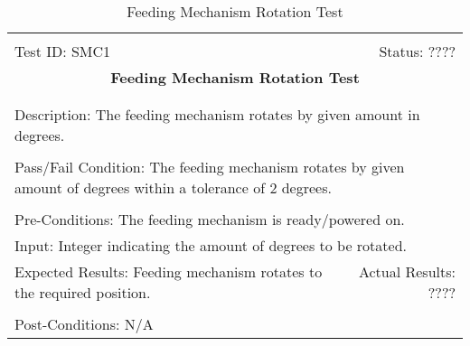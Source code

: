 \documentclass[11pt]{article}
\begin{document}
\begin{center}
\begin{table}[H]
\begin{tabular}{|l r|}\hline&\\[-2mm]
	Test ID: SMC1	&Status: ????\\[-3mm]
	\multicolumn{2}{|c|}{\textbf{\large{Feeding Mechanism Rotation Test}}}\\&\\\hline&\\[-3mm]
	\multicolumn{2}{|p{\textwidth}|}{Description: The feeding mechanism rotates by given amount in degrees.}\\[1mm]\hline&\\[-3mm]
	\multicolumn{2}{|p{\textwidth}|}{Pass/Fail Condition: The feeding mechanism rotates by given amount of degrees within a tolerance of 2 degrees.}\\[1mm]\hline&\\[-3mm]
	\multicolumn{2}{|p{\textwidth}|}{Pre-Conditions: The feeding mechanism is ready/powered on.}\\[4mm]
	\multicolumn{2}{|p{\textwidth}|}{Input: Integer indicating the amount of degrees to be rotated.}\\[2mm]\hline
	\multicolumn{1}{|p{0.49\textwidth}}{Expected Results: Feeding mechanism rotates to the required position.}	&\multicolumn{1}{|p{0.45\textwidth}|}{Actual Results: ????}\\\hline&\\[-3mm]
	\multicolumn{2}{|p{\textwidth}|}{Post-Conditions: N/A}\\\hline
\end{tabular}
\caption{Feeding Mechanism Rotation Test}
\end{table}
\end{center}
\end{document}
